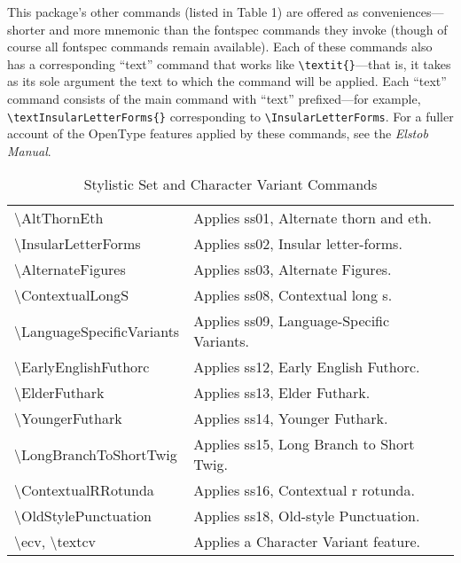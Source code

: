 \documentclass[12pt]{article}
\newcommand{\fspec}{{\sffamily fontspec}}
\newcommand{\bluerow}{\rowcolor{myLightBlue}}
\begin{document}
This package's other commands (listed in Table 1) are offered as conveniences---shorter and more
mnemonic than the {\fspec} commands they invoke (though of course all {\fspec} commands
remain available). Each of these commands
also has a corresponding “text” command that works like 
{\color{BrickRed}\verb|\textit{}|}—that is, it takes
as its sole argument the text to which the command will be applied. Each “text” command
consists of the main command with “text” prefixed—for example,
{\color{BrickRed}\verb|\textInsularLetterForms{}|}
corresponding to {\color{BrickRed}\verb|\InsularLetterForms|}.\linebreak
For a fuller account of the OpenType features
applied by these commands, see the \textit{Elstob Manual}.

\begin{table}[ht]
    \centering
    \begin{tabular}{| l | p{2.75in} |}
        \hline
    \bluerow\textbackslash AltThornEth & Applies ss01, Alternate thorn and eth.\\
    \textbackslash InsularLetterForms & Applies ss02, Insular letter-forms.\\
    \bluerow\textbackslash AlternateFigures & Applies ss03, Alternate Figures.\\
    \textbackslash ContextualLongS & Applies ss08, Contextual long s.\\
    \bluerow\textbackslash LanguageSpecificVariants & \small Applies ss09, Language-Specific Variants.\\
    \textbackslash EarlyEnglishFuthorc & Applies ss12, Early English Futhorc.\\
    \bluerow\textbackslash ElderFuthark & Applies ss13, Elder Futhark.\\
    \textbackslash YoungerFuthark & Applies ss14, Younger Futhark.\\
    \bluerow\textbackslash LongBranchToShortTwig & Applies ss15, Long Branch to Short Twig.\\
    \textbackslash ContextualRRotunda & Applies ss16, Contextual r rotunda.\\
    \bluerow\textbackslash OldStylePunctuation & Applies ss18, Old-style Punctuation.\\
    \textbackslash ecv, \textbackslash textcv & Applies a Character Variant feature.\\
    \hline
    \end{tabular}
\caption{Stylistic Set and Character Variant Commands}
\end{table}
\end{document}
